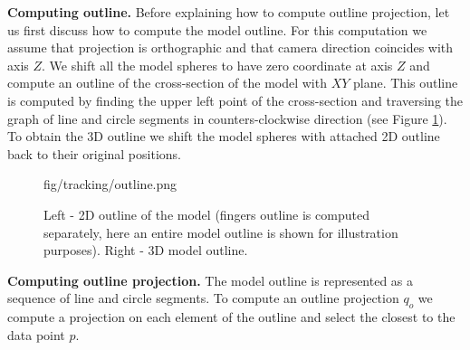 \textbf{Computing outline.}
Before explaining how to compute outline projection, let us first discuss how to compute the model outline. For this computation we assume that projection is orthographic and that camera direction coincides with axis $Z$. We shift all the model spheres to have zero coordinate at axis $Z$ and compute an outline of the cross-section of the model with $XY$ plane. This outline is computed by finding the upper left point of the cross-section and traversing the graph of line and circle segments in counters-clockwise direction (see Figure \ref{fig:outline}). To obtain the 3D outline we shift the model spheres with attached 2D outline back to their original positions.

\begin{figure}[h]
	\centering
	\begin{overpic} 
		[width=\linewidth]
		{fig/tracking/outline.png}
	\end{overpic}
	\caption{ Left - 2D outline of the model (fingers outline is computed separately, here an entire model outline is shown for illustration purposes). Right - 3D model outline.} 
	\label{fig:outline}
\end{figure}

\textbf{Computing outline projection.}
The model outline is represented as a sequence of line and circle segments. To compute an outline projection $q_o$ we compute a projection on each element of the outline and select the closest to the data point $p$.